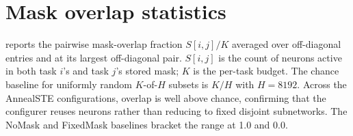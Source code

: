 \documentclass[11pt]{article}
\begin{document}
\section{Mask overlap statistics}\label{app:mask_overlap}
 reports the pairwise mask-overlap fraction $S[i,j]/K$ averaged over off-diagonal entries and at its largest off-diagonal pair. $S[i,j]$ is the count of neurons active in both task $i$'s and task $j$'s stored mask; $K$ is the per-task budget. The chance baseline for uniformly random $K$-of-$H$ subsets is $K/H$ with $H=8192$. Across the AnnealSTE configurations, overlap is well above chance, confirming that the configurer reuses neurons rather than reducing to fixed disjoint subnetworks. The NoMask and FixedMask baselines bracket the range at 1.0 and 0.0.

\begin{table}[ht]
\centering
\small
\caption{Pairwise mask-overlap fraction $S[i,j]/K$ across configurations. ``mean off-diag'' averages over all $i\ne j$ entries; ``max off-diag'' is the largest pair per run, then averaged over seeds. Chance is the expected overlap for uniformly random $K$-of-$H$ subsets.}

\label{tab:mask_overlap}
\end{table}
\end{document}

